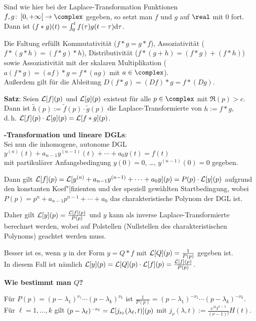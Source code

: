 Sind wie hier bei der Laplace-Transformation Funktionen
$f, g\colon \left[0, +\infty\right[ \rightarrow \complex$ gegeben,
so setzt man $f$ und $g$ auf $\real$ mit $0$ fort.
Dann ist $(f \ast g)(t) = \int_0^t f(\tau) g(t - \tau) \mathrm{d}\tau$.

Die Faltung erfüllt Kommutativität ($f \ast g = g \ast f$),
Assoziativität ($f \ast (g \ast h) = (f \ast g) \ast h$),
Distributivität ($f \ast (g + h) = (f \ast g) + (f \ast h)$) sowie
Assoziativität mit der skalaren Multiplikation
($a(f \ast g) = (af) \ast g = f \ast (ag)$ mit $a \in \complex$). \\
Außerdem gilt für die Ableitung
$D(f \ast g) = (Df) \ast g = f \ast (Dg)$.

\textbf{Satz}:
Seien $\mathcal{L}[f](p)$ und $\mathcal{L}[g](p)$ existent für alle $p \in \complex$ mit
$\Re(p) > c$. \\
Dann ist $\widetilde{h}(p) := \widetilde{f}(p) \cdot \widetilde{g}(p)$ die
Laplace-Transformierte von $h := f \ast g$, \\
d.\,h. $\mathcal{L}[f](p) \cdot \mathcal{L}[g](p) = \mathcal{L}[f \ast g](p)$.

\linie
\pagebreak

\textbf{-Transformation und lineare DGLs}: \\
Sei nun die inhomogene, autonome DGL
$y^{(n)}(t) + a_{n-1} y^{(n-1)}(t) + \dotsb + a_0 y(t) = f(t)$ \\
mit partikulärer Anfangsbedingung
$y(0) = 0$, \dots, $y^{(n-1)}(0) = 0$ gegeben.

Dann gilt
$\mathcal{L}[f](p) = \mathcal{L}[y^{(n)} + a_{n-1} y^{(n-1)} + \dotsb + a_0 y](p)
= P(p) \cdot \mathcal{L}[y](p)$ aufgrund den konstanten Koef"|fizienten und der speziell
gewählten Startbedingung, wobei
$P(p) = p^n + a_{n-1} p^{n-1} + \dotsb + a_0$ das charakteristische Polynom
der DGL ist.

Daher gilt $\mathcal{L}[y](p) = \frac{\mathcal{L}[f](p)}{P(p)}$ und $y$ kann als inverse
Laplace-Transformierte berechnet werden, wobei auf Polstellen (Nullstellen
des charakteristischen Polynoms) geachtet werden muss.

Besser ist es, wenn $y$ in der Form
$y = Q \ast f$ mit $\mathcal{L}[Q](p) = \frac{1}{P(p)}$ gegeben ist. \\
In diesem Fall ist nämlich
$\mathcal{L}[y](p) = \mathcal{L}[Q](p) \cdot \mathcal{L}[f](p) = \frac{\mathcal{L}[f](p)}{P(p)}$.

\linie

\textbf{Wie bestimmt man $Q$?}

Für $P(p) = (p - \lambda_1)^{\nu_1} \dotsm (p - \lambda_k)^{\nu_k}$
ist $\frac{1}{P(p)} = (p - \lambda_1)^{-\nu_1} \dotsm
(p - \lambda_k)^{-\nu_k}$. \\
Für $\ell = 1, \dotsc, k$ gilt
$(p - \lambda_\ell)^{-\nu_\ell} = \mathcal{L}[j_{\nu_\ell}(\lambda_\ell, t)](p)$ mit
$j_\nu(\lambda, t) := \frac{e^{\lambda t} t^{\nu-1}}{(\nu - 1)!} H(t)$.

